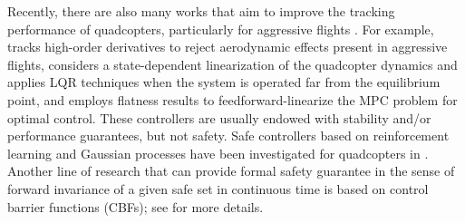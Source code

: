 \documentclass[journal,10pt]{IEEEtran}
\begin{document}

Recently, there are also many works that aim to improve the tracking performance of quadcopters, particularly for aggressive flights \cite{invernizzi2020comparison,tal2020accurate,foehn2018onboard,FMPC}. 
For example,  \cite{tal2020accurate} tracks high-order derivatives to reject aerodynamic effects present in aggressive flights, \cite{foehn2018onboard} considers a state-dependent linearization of the quadcopter dynamics and applies LQR techniques when the system is operated far from the equilibrium point, and \cite{FMPC} employs flatness results to feedforward-linearize the MPC problem for optimal control. These controllers are usually endowed with stability and/or performance guarantees, but not safety.  Safe controllers based on reinforcement learning and Gaussian processes have been investigated for quadcopters in \cite{lupashin2010simple,singla2019memory,berkenkamp2017safe}. Another line of research that can provide formal safety guarantee in the sense of forward invariance of a given safe set in continuous time is based on control barrier functions (CBFs); see  \cite{ames2016control,cbf_pos,IBVS,rosolia2020unified} for more details. 
\end{document}
